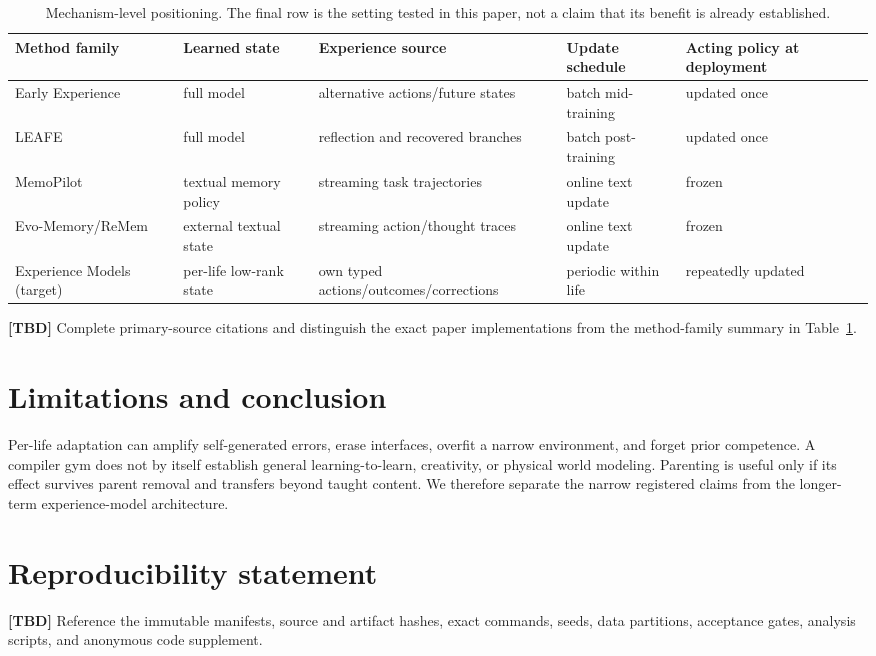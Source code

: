 \documentclass{article}
\newcommand{\tbd}{\textbf{[TBD]}}
\begin{document}
\begin{table}[t]
\centering
\small
\begin{tabular}{lllll}
\toprule
Method family & Learned state & Experience source & Update schedule & Acting policy at deployment \\
\midrule
Early Experience \citep{zhang2025earlyexperience} & full model & alternative actions/future states & batch mid-training & updated once \\
LEAFE \citep{ge2026leafe} & full model & reflection and recovered branches & batch post-training & updated once \\
MemoPilot \citep{cai2026memopilot} & textual memory policy & streaming task trajectories & online text update & frozen \\
Evo-Memory/ReMem \citep{wei2025evomemory} & external textual state & streaming action/thought traces & online text update & frozen \\
Experience Models (target) & per-life low-rank state & own typed actions/outcomes/corrections & periodic within life & repeatedly updated \\
\bottomrule
\end{tabular}
\caption{Mechanism-level positioning. The final row is the setting tested in
this paper, not a claim that its benefit is already established.}
\label{tab:positioning}
\end{table}

\tbd{} Complete primary-source citations and distinguish the exact paper
implementations from the method-family summary in Table~\ref{tab:positioning}.

\section{Limitations and conclusion}

Per-life adaptation can amplify self-generated errors, erase interfaces,
overfit a narrow environment, and forget prior competence. A compiler gym does
not by itself establish general learning-to-learn, creativity, or physical
world modeling. Parenting is useful only if its effect survives parent removal
and transfers beyond taught content. We therefore separate the narrow
registered claims from the longer-term experience-model architecture.

\section*{Reproducibility statement}
\tbd{} Reference the immutable manifests, source and artifact hashes, exact
commands, seeds, data partitions, acceptance gates, analysis scripts, and
anonymous code supplement.
\end{document}
